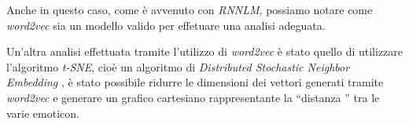 \documentclass[a4paper,12pt,openright,twoside]{report}
\theoremstyle{definition}
\begin{document}
Anche in questo caso, come è avvenuto con \emph{RNNLM}, possiamo notare come \emph{word2vec} sia un modello valido
per effetuare una analisi adeguata.

%

Un'altra analisi effettuata tramite l'utilizzo di \emph{word2vec} è stato
quello di utilizzare l'algoritmo \emph{t-SNE}, cioè un algoritmo di \emph{Distributed Stochastic Neighbor Embedding }, è stato possibile
ridurre le dimensioni dei vettori generati tramite \emph{word2vec} e generare un grafico cartesiano rappresentante la ``distanza ''
tra le varie emoticon.
\end{document}
